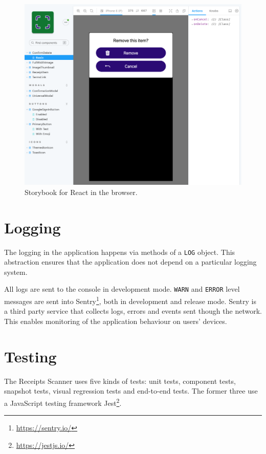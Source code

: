 \documentclass[
  digital, %
  table,   %
  oneside, %
  lof,     %
  lot,     %
]{fithesis3}
\begin{document}
\begin{figure}
    \begin{center}
        \includegraphics[width=\textwidth]{figures/other/storybook_web}
    \end{center}
    \caption{Storybook for React in the browser.}
    \label{fig:storybook_web}
\end{figure}

\section{Logging}
The logging in the application happens via methods of a \texttt{LOG} object. This abstraction ensures that the application does not depend on a particular logging system.

All logs are sent to the console in development mode. \texttt{WARN} and \texttt{ERROR} level messages are sent into Sentry\footnote{\url{https://sentry.io/}}, both in development and release mode. Sentry is a third party service that collects logs, errors and events sent though the network. This enables monitoring of the application behaviour on users' devices.

\section{Testing}
The Receipts Scanner uses five kinds of tests: unit tests, component tests, snapshot tests, visual regression tests and end-to-end tests.
The former three use a JavaScript testing framework Jest\footnote{\url{https://jestjs.io/}}.
\end{document}

